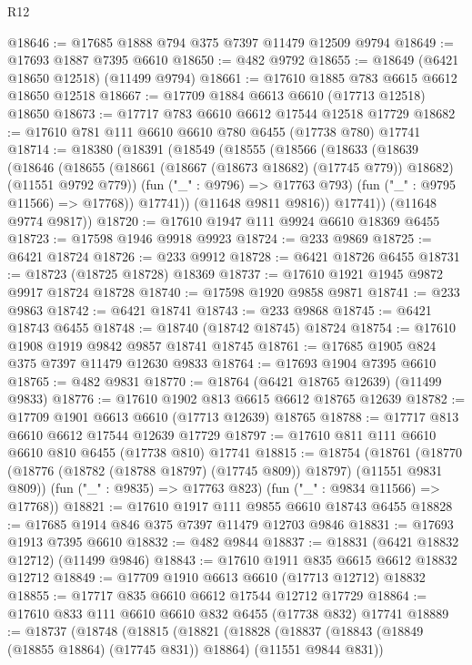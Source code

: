 \begin{lexlean}{R12}
\begin{coremodule}
{{{{{{{{{{{{{{{{{{{{{{{{{{{{{{{{{{{{{{{{{{{{{{{{{{{{{{{{{{{{{{{{{{{{{{{{{{{{{{{{{{@18646 := @17685 @1888 @794 @375 @7397 @11479 @12509 @9794
@18649 := @17693 @1887 @7395 @6610
@18650 := @482 @9792
@18655 := @18649 (@6421 @18650 @12518) (@11499 @9794)
@18661 := @17610 @1885 @783 @6615 @6612 @18650 @12518
@18667 := @17709 @1884 @6613 @6610 (@17713 @12518) @18650
@18673 := @17717 @783 @6610 @6612 @17544 @12518 @17729
@18682 := @17610 @781 @111 @6610 @6610 @780 @6455 (@17738 @780) @17741
@18714 := @18380
    (@18391
      (@18549
        (@18555
          (@18566
            (@18633
              (@18639
                (@18646
                  (@18655
                    (@18661 (@18667 (@18673 @18682) (@17745 @779)) @18682)
                    (@11551 @9792 @779))
                  (fun ("_" : @9796) => @17763 @793)
                  (fun ("_" : @9795 @11566) => @17768))
                @17741))
            (@11648 @9811 @9816))
          @17741))
      (@11648 @9774 @9817))
@18720 := @17610 @1947 @111 @9924 @6610 @18369 @6455
@18723 := @17598 @1946 @9918 @9923
@18724 := @233 @9869
@18725 := @6421 @18724
@18726 := @233 @9912
@18728 := @6421 @18726 @6455
@18731 := @18723 (@18725 @18728) @18369
@18737 := @17610 @1921 @1945 @9872 @9917 @18724 @18728
@18740 := @17598 @1920 @9858 @9871
@18741 := @233 @9863
@18742 := @6421 @18741
@18743 := @233 @9868
@18745 := @6421 @18743 @6455
@18748 := @18740 (@18742 @18745) @18724
@18754 := @17610 @1908 @1919 @9842 @9857 @18741 @18745
@18761 := @17685 @1905 @824 @375 @7397 @11479 @12630 @9833
@18764 := @17693 @1904 @7395 @6610
@18765 := @482 @9831
@18770 := @18764 (@6421 @18765 @12639) (@11499 @9833)
@18776 := @17610 @1902 @813 @6615 @6612 @18765 @12639
@18782 := @17709 @1901 @6613 @6610 (@17713 @12639) @18765
@18788 := @17717 @813 @6610 @6612 @17544 @12639 @17729
@18797 := @17610 @811 @111 @6610 @6610 @810 @6455 (@17738 @810) @17741
@18815 := @18754
    (@18761
      (@18770 (@18776 (@18782 (@18788 @18797) (@17745 @809)) @18797) (@11551 @9831 @809))
      (fun ("_" : @9835) => @17763 @823)
      (fun ("_" : @9834 @11566) => @17768))
@18821 := @17610 @1917 @111 @9855 @6610 @18743 @6455
@18828 := @17685 @1914 @846 @375 @7397 @11479 @12703 @9846
@18831 := @17693 @1913 @7395 @6610
@18832 := @482 @9844
@18837 := @18831 (@6421 @18832 @12712) (@11499 @9846)
@18843 := @17610 @1911 @835 @6615 @6612 @18832 @12712
@18849 := @17709 @1910 @6613 @6610 (@17713 @12712) @18832
@18855 := @17717 @835 @6610 @6612 @17544 @12712 @17729
@18864 := @17610 @833 @111 @6610 @6610 @832 @6455 (@17738 @832) @17741
@18889 := @18737
    (@18748
      (@18815
        (@18821
          (@18828
            (@18837 (@18843 (@18849 (@18855 @18864) (@17745 @831)) @18864) (@11551 @9844 @831))
}}}}}}}}}}}}}}}}}}}}}}}}}}}}}}}}}}}}}}}}}}}}}}}}}}}}}}}}}}}}}}}}}}}}}}}}}}}}}}}}}}
\end{coremodule}
\end{lexlean}
